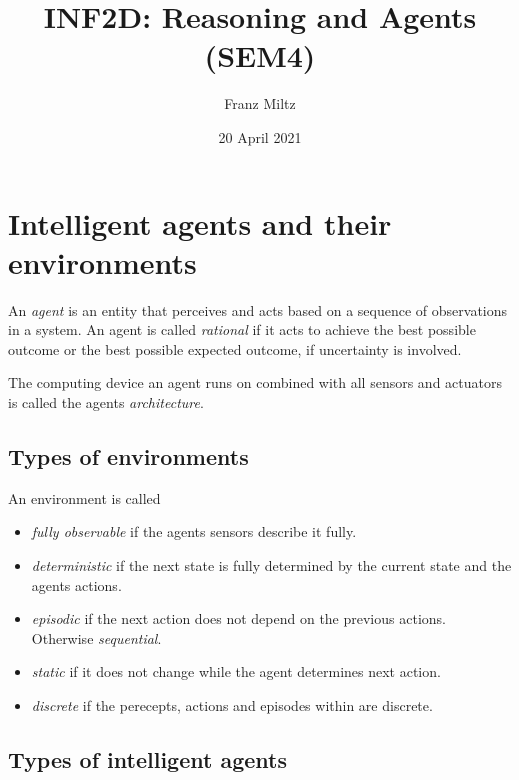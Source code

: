\documentclass{article}
\title{INF2D: Reasoning and Agents (SEM4)}
\author{Franz Miltz}
\date{20 April 2021}
\begin{document}
\maketitle
\tableofcontents
\pagebreak

\section{Intelligent agents and their environments}

\begin{definition}
    An \emph{agent} is an entity that perceives and
    acts based on a sequence of observations in a system.
    An agent is called \emph{rational} if it acts to achieve
    the best possible outcome or the best possible expected
    outcome, if uncertainty is involved.
    
    The computing device an agent runs on combined with all sensors and actuators
    is called the agents \emph{architecture}.
\end{definition}

\subsection{Types of environments}

\begin{definition}[R\&N p. 42]
    An environment is called
    \begin{itemize}
        \item \emph{fully observable} if the agents sensors describe it fully.
        \item \emph{deterministic} if the next state is fully
        determined by the current state and the agents actions.
        \item \emph{episodic} if the next action does not depend on the previous
        actions. Otherwise \emph{sequential}.
        \item \emph{static} if it does not change while the agent determines
        next action.
        \item \emph{discrete} if the perecepts, actions and episodes within
        are discrete.
    \end{itemize}
\end{definition}

\subsection{Types of intelligent agents}
\end{document}
